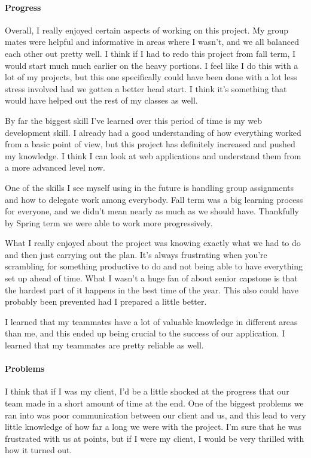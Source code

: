 \documentclass[onecolumn, draftclsnofoot,10pt, compsoc]{IEEEtran}
\begin{document}
	\paragraph{Progress}
	
	Overall, I really enjoyed certain aspects of working on this project. My group mates were helpful and informative in areas where I wasn't, and we all balanced each other out pretty well. I think if I had to redo this project from fall term, I would start much much earlier on the heavy portions. I feel like I do this with a lot of my projects, but this one specifically could have been done with a lot less stress involved had we gotten a better head start. I think it's something that would have helped out the rest of my classes as well.
	
	By far the biggest skill I've learned over this period of time is my web development skill. I already had a good understanding of how everything worked from a basic point of view, but this project has definitely increased and pushed my knowledge. I think I can look at web applications and understand them from a more advanced level now.
	
	One of the skills I see myself using in the future is handling group assignments and how to delegate work among everybody. Fall term was a big learning process for everyone, and we didn't mean nearly as much as we should have. Thankfully by Spring term we were able to work more progressively.
	
	What I really enjoyed about the project was knowing exactly what we had to do and then just carrying out the plan. It's always frustrating when you're scrambling for something productive to do and not being able to have everything set up ahead of time. What I wasn't a huge fan of about senior capstone is that the hardest part of it happens in the best time of the year. This also could have probably been prevented had I prepared a little better.
	
	I learned that my teammates have a lot of valuable knowledge in different areas than me, and this ended up being crucial to the success of our application. I learned that my teammates are pretty reliable as well.
	
	\paragraph{Problems}
	
	I think that if I was my client, I'd be a little shocked at the progress that our team made in a short amount of time at the end. One of the biggest problems we ran into was poor communication between our client and us, and this lead to very little knowledge of how far a long we were with the project. I'm sure that he was frustrated with us at points, but if I were my client, I would be very thrilled with how it turned out. 
	
\end{document}
